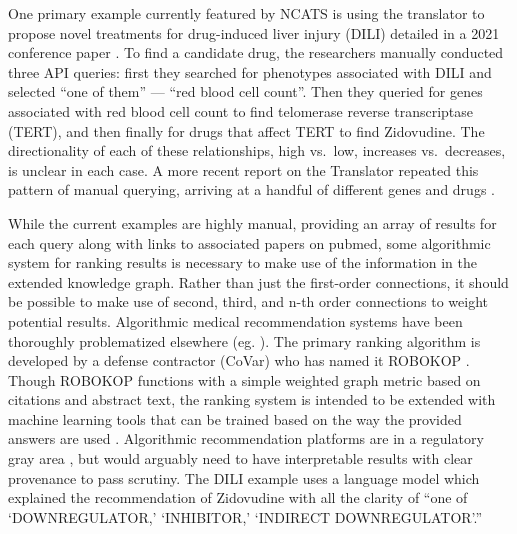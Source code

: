 One primary example currently featured by NCATS is using the translator
to propose novel treatments for drug-induced liver injury (DILI) \citep{renaissancecomputinginstituterenciUseCasesShow2022}  detailed in
a 2021 conference paper \citep{goelExplanationContainerCaseBased2021} . To find a candidate drug, the researchers manually conducted three
API queries: first they searched for phenotypes associated with DILI and
selected ``one of them'' --- ``red blood cell count''. Then they queried for genes
associated with red blood cell count to find telomerase reverse
transcriptase (TERT), and then finally for drugs that affect TERT to
find Zidovudine. The directionality of each of these relationships, high
vs.~low, increases vs.~decreases, is unclear in each case. A more recent
report on the Translator repeated this pattern of manual querying,
arriving at a handful of different genes and drugs \citep{fechoProgressUniversalBiomedical2022} .

While the current examples are highly manual, providing an array of
results for each query along with links to associated papers on pubmed,
some algorithmic system for ranking results is necessary to make use of
the information in the extended knowledge graph. Rather than just the
first-order connections, it should be possible to make use of second,
third, and n-th order connections to weight potential results.
Algorithmic medical recommendation systems have been thoroughly
problematized elsewhere (eg. \citep{groteEthicsAlgorithmicDecisionmaking2020, obermeyerDissectingRacialBias2019, panchArtificialIntelligenceAlgorithmic2019, panchInconvenientTruthAI2019} ). The primary ranking algorithm is developed by a defense
contractor (CoVar) who has named it
ROBOKOP \citep{mortonROBOKOPAbstractionLayer2019} . Though ROBOKOP functions with a
simple weighted graph metric based on citations and abstract text, the
ranking system is intended to be extended with machine learning tools
\citep{mortonROBOKOPAbstractionLayer2019}  that can be trained
based on the way the provided answers are used \citep{consortiumUniversalBiomedicalData2019} . Algorithmic recommendation
platforms are in a regulatory gray area \citep{ordishAlgorithmsMedicalDevices2019, el-sayedMedicalAlgorithmsNeed2021} , but would arguably need to have interpretable results with clear
provenance to pass scrutiny. The DILI example uses a language model
which explained the recommendation of Zidovudine with all the clarity of
``one of `DOWNREGULATOR,' `INHIBITOR,' `INDIRECT DOWNREGULATOR'.''

